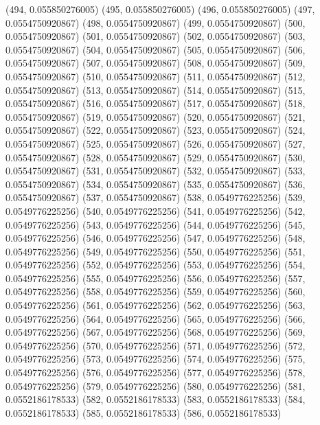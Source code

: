 {					(494, 0.055850276005)
					(495, 0.055850276005)
					(496, 0.055850276005)
					(497, 0.0554750920867)
					(498, 0.0554750920867)
					(499, 0.0554750920867)
					(500, 0.0554750920867)
					(501, 0.0554750920867)
					(502, 0.0554750920867)
					(503, 0.0554750920867)
					(504, 0.0554750920867)
					(505, 0.0554750920867)
					(506, 0.0554750920867)
					(507, 0.0554750920867)
					(508, 0.0554750920867)
					(509, 0.0554750920867)
					(510, 0.0554750920867)
					(511, 0.0554750920867)
					(512, 0.0554750920867)
					(513, 0.0554750920867)
					(514, 0.0554750920867)
					(515, 0.0554750920867)
					(516, 0.0554750920867)
					(517, 0.0554750920867)
					(518, 0.0554750920867)
					(519, 0.0554750920867)
					(520, 0.0554750920867)
					(521, 0.0554750920867)
					(522, 0.0554750920867)
					(523, 0.0554750920867)
					(524, 0.0554750920867)
					(525, 0.0554750920867)
					(526, 0.0554750920867)
					(527, 0.0554750920867)
					(528, 0.0554750920867)
					(529, 0.0554750920867)
					(530, 0.0554750920867)
					(531, 0.0554750920867)
					(532, 0.0554750920867)
					(533, 0.0554750920867)
					(534, 0.0554750920867)
					(535, 0.0554750920867)
					(536, 0.0554750920867)
					(537, 0.0554750920867)
					(538, 0.0549776225256)
					(539, 0.0549776225256)
					(540, 0.0549776225256)
					(541, 0.0549776225256)
					(542, 0.0549776225256)
					(543, 0.0549776225256)
					(544, 0.0549776225256)
					(545, 0.0549776225256)
					(546, 0.0549776225256)
					(547, 0.0549776225256)
					(548, 0.0549776225256)
					(549, 0.0549776225256)
					(550, 0.0549776225256)
					(551, 0.0549776225256)
					(552, 0.0549776225256)
					(553, 0.0549776225256)
					(554, 0.0549776225256)
					(555, 0.0549776225256)
					(556, 0.0549776225256)
					(557, 0.0549776225256)
					(558, 0.0549776225256)
					(559, 0.0549776225256)
					(560, 0.0549776225256)
					(561, 0.0549776225256)
					(562, 0.0549776225256)
					(563, 0.0549776225256)
					(564, 0.0549776225256)
					(565, 0.0549776225256)
					(566, 0.0549776225256)
					(567, 0.0549776225256)
					(568, 0.0549776225256)
					(569, 0.0549776225256)
					(570, 0.0549776225256)
					(571, 0.0549776225256)
					(572, 0.0549776225256)
					(573, 0.0549776225256)
					(574, 0.0549776225256)
					(575, 0.0549776225256)
					(576, 0.0549776225256)
					(577, 0.0549776225256)
					(578, 0.0549776225256)
					(579, 0.0549776225256)
					(580, 0.0549776225256)
					(581, 0.0552186178533)
					(582, 0.0552186178533)
					(583, 0.0552186178533)
					(584, 0.0552186178533)
					(585, 0.0552186178533)
					(586, 0.0552186178533)
}
